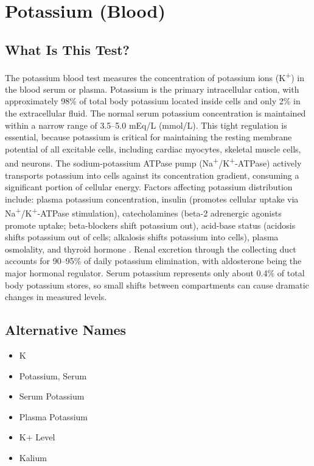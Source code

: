 \chapter{Potassium (Blood)}

\section*{What Is This Test?}
The potassium blood test measures the concentration of potassium ions (K\textsuperscript{+}) in the blood serum or plasma. Potassium is the primary intracellular cation, with approximately 98\% of total body potassium located inside cells and only 2\% in the extracellular fluid. The normal serum potassium concentration is maintained within a narrow range of 3.5--5.0 mEq/L (mmol/L). This tight regulation is essential, because potassium is critical for maintaining the resting membrane potential of all excitable cells, including cardiac myocytes, skeletal muscle cells, and neurons. The sodium-potassium ATPase pump (Na\textsuperscript{+}/K\textsuperscript{+}-ATPase) actively transports potassium into cells against its concentration gradient, consuming a significant portion of cellular energy. Factors affecting potassium distribution include: plasma potassium concentration, insulin (promotes cellular uptake via Na\textsuperscript{+}/K\textsuperscript{+}-ATPase stimulation), catecholamines (beta-2 adrenergic agonists promote uptake; beta-blockers shift potassium out), acid-base status (acidosis shifts potassium out of cells; alkalosis shifts potassium into cells), plasma osmolality, and thyroid hormone \cite{palmer2016physiology}. Renal excretion through the collecting duct accounts for 90--95\% of daily potassium elimination, with aldosterone being the major hormonal regulator. Serum potassium represents only about 0.4\% of total body potassium stores, so small shifts between compartments can cause dramatic changes in measured levels.

\section*{Alternative Names}
\begin{itemize}
  \item K
  \item Potassium, Serum
  \item Serum Potassium
  \item Plasma Potassium
  \item K+ Level
  \item Kalium
\end{itemize}
